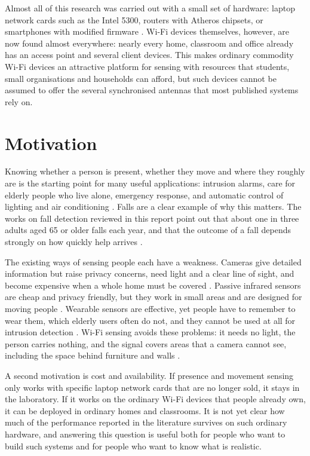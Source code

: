 Almost all of this research was carried out with a small set of hardware: laptop network cards such as the Intel 5300, routers with Atheros chipsets, or smartphones with modified firmware \cite{sensefi,survey2019}. Wi-Fi devices themselves, however, are now found almost everywhere: nearly every home, classroom and office already has an access point and several client devices. This makes ordinary commodity Wi-Fi devices an attractive platform for sensing with resources that students, small organisations and households can afford, but such devices cannot be assumed to offer the several synchronised antennas that most published systems rely on.

\section{Motivation}
Knowing whether a person is present, whether they move and where they roughly are is the starting point for many useful applications: intrusion alarms, care for elderly people who live alone, emergency response, and automatic control of lighting and air conditioning \cite{alpd,deman}. Falls are a clear example of why this matters. The works on fall detection reviewed in this report point out that about one in three adults aged 65 or older falls each year, and that the outcome of a fall depends strongly on how quickly help arrives \cite{wifall,rtfall}.

The existing ways of sensing people each have a weakness. Cameras give detailed information but raise privacy concerns, need light and a clear line of sight, and become expensive when a whole home must be covered \cite{alpd,antifall}. Passive infrared sensors are cheap and privacy friendly, but they work in small areas and are designed for moving people \cite{alpd}. Wearable sensors are effective, yet people have to remember to wear them, which elderly users often do not, and they cannot be used at all for intrusion detection \cite{falldefi,carmjsac}. Wi-Fi sensing avoids these problems: it needs no light, the person carries nothing, and the signal covers areas that a camera cannot see, including the space behind furniture and walls \cite{carmjsac}.

A second motivation is cost and availability. If presence and movement sensing only works with specific laptop network cards that are no longer sold, it stays in the laboratory. If it works on the ordinary Wi-Fi devices that people already own, it can be deployed in ordinary homes and classrooms. It is not yet clear how much of the performance reported in the literature survives on such ordinary hardware, and answering this question is useful both for people who want to build such systems and for people who want to know what is realistic.

